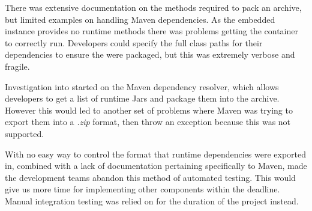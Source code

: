 \par
There was extensive documentation on the methods required to pack an archive, but limited examples on handling Maven dependencies. As the embedded instance provides no runtime methods there was problems getting the container to correctly run. Developers could specify the full class paths for their dependencies to ensure the were packaged, but this was extremely verbose and fragile.

\par
Investigation into started on the Maven dependency resolver, which allows developers to get a list of runtime Jars and package them into the archive. However this would led to another set of problems where Maven was trying to export them into a \textit{.zip} format, then throw an exception because this was not supported.

\par
With no easy way to control the format that runtime dependencies were exported in, combined with a lack of documentation pertaining specifically to Maven, made the development teams abandon this method of automated testing. This would give us more time for implementing other components within the deadline. Manual integration testing was relied on for the duration of the project instead.
